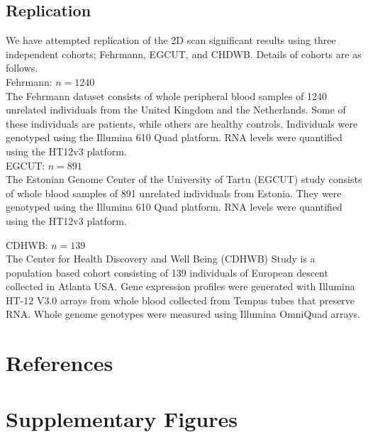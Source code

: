 \documentclass{article}
\begin{document}
\subsection{Replication}
We have attempted replication of the 2D scan significant results using three independent cohorts; Fehrmann, EGCUT, and CHDWB. Details of cohorts are as follows. \\[0.1cm]  

Fehrmann: $n=1240$ \\[0.1cm]
The Fehrmann dataset consists of whole peripheral blood samples of 1240 unrelated individuals from the United Kingdom and the Netherlands. Some of these individuals are patients, while others are healthy controls. Individuals were genotyped using the Illumina 610 Quad platform. RNA levels were quantified using the HT12v3 platform. \\[0.1cm]

EGCUT: $n=891$ \\[0.1cm]
The Estonian Genome Center of the University of Tartu (EGCUT) study consists of whole blood samples of 891 unrelated individuals from Estonia. They were genotyped using the Illumina 610 Quad platform. RNA levels were quantified using the HT12v3 platform.

CDHWB: $n=139$ \\ [0.1cm]
The Center for Health Discovery and Well Being (CDHWB) Study is a population based cohort consisting of 139 individuals of European descent collected in Atlanta USA. Gene expression profiles were generated with Illumina HT-12 V3.0 arrays from whole blood collected from Tempus tubes that preserve RNA. Whole genome genotypes were measured using Illumina OmniQuad arrays. \\[0.1cm]


\clearpage
\section{References}



\clearpage
\section{Supplementary Figures}
\setcounter{figure}{0}
\makeatletter 
\renewcommand{\thefigure}{S\@arabic\c@figure} 
\makeatletter 
\end{document}
